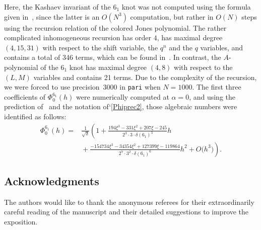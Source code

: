 \documentclass[pdftex]{sigma}
\numberwithin{equation}{section}
\def\a{\alpha}
\def\a{\alpha}
\begin{document}
Here, the Kashaev invariant of the $6_1$ knot was not computed
using the formula given in~\cite[equation~(24)]{K97}, since the
latter is an $O(N^3)$ computation, but rather in $O(N)$ steps
using the recursion relation of the colored Jones polynomial.
The rather complicated inhomogeneous recursion has order $4$,
has maximal degree $(4,15,31)$ with respect to the shift variable, the
$q^n$ and the $q$ variables, and contains a total of 346 terms, which
can be found in~\cite{Ga:twistdata,GS}.
In contrast, the $A$-polynomial of the $6_1$ knot has maximal degree
$(4,8)$ with respect to the $(L,M)$ variables and contains 21 terms.
Due to the complexity of the recursion, we were forced to use precision~3000 in \texttt{pari} when $N=1000$. The first three coefficients of
$\Phi^{6_1}_0(h)$ were numerically computed at $\a=0$, and using the
prediction of~\cite{DG} and the notation of`\eqref{Phiprec2},
those algebraic numbers were identified as follows:
\begin{align*}
\Phi^{6_1}_0(h) =& {} \frac{1}{\sqrt{\delta}} \left( 1
+ \frac{194 \xi^3 - 331 \xi^2 + 207 \xi - 245}{2^3\cdot 3 \cdot \delta(6_1)^3} h\right.
\\
&\left.{} + \frac{-154734 \xi^3 - 34354 \xi^2 + 127399 \xi - 119864}{2^7 \cdot 3^2
\cdot \delta(6_1)^6}h^2
+ O\bigl(h^3\bigr) \right) .
\end{align*}

\subsection*{Acknowledgments}

The authors would like to thank the anonymous referees for their extraordinarily
careful reading of the manuscript and their detailed suggestions to improve
the exposition.

\newpage
\end{document}
